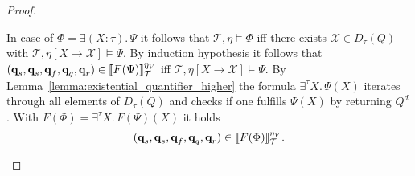 \begin{proof}
\begin{compactitem}
        \item In case of $\Phi = \exists (X \colon \tau).\,\Psi$ it follows that $\mathcal{T}, \eta \models \Phi$ iff
        there exists $\mathcal{X} \in D_\tau(Q)$ with $\mathcal{T}, \eta[X \rightarrow \mathcal {X}] \models \Psi$.
        By induction hypothesis it follows that $(\emph{q}_s, \emph{q}_s, \emph{q}_f, \emph{q}_q, \emph{q}_r) \in
        \llbracket F(\Psi) \rrbracket^{\eta_V}_\mathcal{T}$ iff $\mathcal{T}, \eta[X
        \rightarrow \mathcal {X}] \models \Psi$. By Lemma~\ref{lemma:existential_quantifier_higher} the formula
        $\exists^\tau X.\, \Psi(X)$ iterates through all elements of $D_\tau(Q)$ and checks if one fulfills $\Psi(X)$
        by returning $Q^d$.
        With $F(\Phi) = \exists^\tau X.\, F(\Psi)(X)$ it holds \[(\emph{q}_s, \emph{q}_s, \emph{q}_f, \emph{q}_q, \emph{q}_r) \in
        \llbracket F(\Phi) \rrbracket^{\eta_V}_\mathcal{T}.\]


\end{compactitem}
\end{proof}
